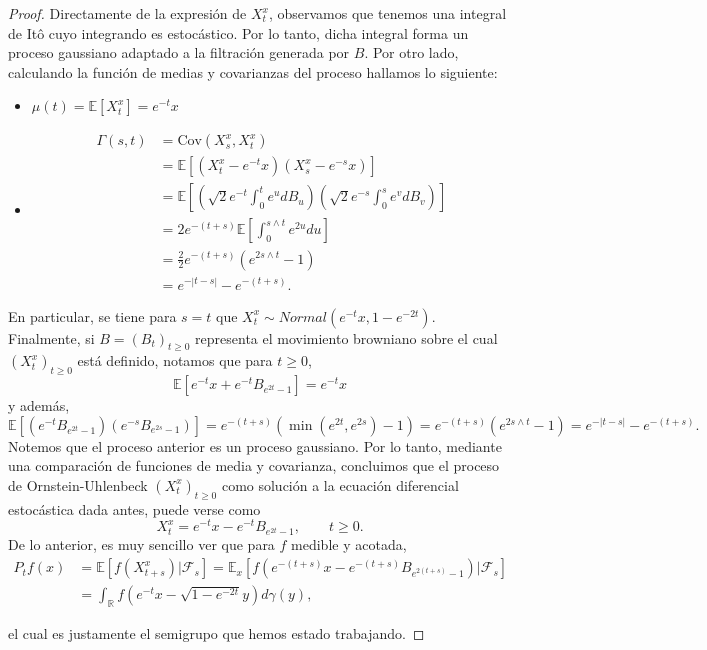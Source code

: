 \documentclass[letterpaper,twoside,12pt]{book}
\newcommand{\R}{\mathbb{R}}
\newcommand{\F}{\mathcal{F}}
\newcommand{\E}{\mathbb{E}}
\newcommand{\1}{\mathds{1}}
\theoremstyle{definition}
\theoremstyle{definition}
\theoremstyle{remark}
\theoremstyle{definition}
\theoremstyle{definition}
\theoremstyle{definition}
\theoremstyle{definition}
\theoremstyle{definition}
\begin{document}
\begin{proof}
     Directamente de la expresión de $X_t^{x}$, observamos que tenemos una integral de Itô cuyo integrando es estocástico. Por lo tanto, dicha integral forma un proceso gaussiano adaptado a la filtración generada por $B$. Por otro lado, calculando la función de medias y covarianzas del proceso hallamos lo siguiente:
     \begin{itemize}
        \item $\mu(t)=\E\left[X_t^{x}\right]=e^{-t}x$
        \item \begin{align*}\Gamma(s,t)&=\text{Cov}\left(X_s^x,X_t^x\right)\\
            &=\E\left[\left(X_t^{x}-e^{-t}x\right)\left(X_s^x-e^{-s}x\right)\right]\\
            &=\E\left[\left(\sqrt{2}e^{-t}\int_{0}^{t}e^{u}dB_u\right)\left(\sqrt{2}e^{-s}\int_{0}^{s}e^{v}dB_v\right)\right]\\
            &=2e^{-(t+s)}\E\left[\int_{0}^{s\wedge t}e^{2u}du\right]\\
            &=\frac{2}{2}e^{-(t+s)}(e^{2s\wedge t}-1)\\
            &=e^{-|t-s|}-e^{-(t+s)}.
        \end{align*}
     \end{itemize}
     En particular, se tiene para $s=t$ que $X_t^x\sim Normal(e^{-t}x,1-e^{-2t})$. Finalmente, si $B=(B_t)_{t\geq0}$ representa el movimiento browniano sobre el cual $(X_t^x)_{t\geq0}$ está definido, notamos que para $t\geq0$,
     \[
     \E\left[e^{-t}x+e^{-t}B_{e^{2t}-1}\right]=e^{-t}x
     \]
     y además, 
     \[
     \E\left[\left(e^{-t}B_{e^{2t}-1}\right) \left(e^{-s}B_{e^{2s}-1}\right)\right]=e^{-(t+s)}(\min(e^{2t},e^{2s})-1)=e^{-(t+s)}(e^{2s\wedge t}-1)=e^{-|t-s|}-e^{-(t+s)}.
     \]
     Notemos que el proceso anterior es un proceso gaussiano. Por lo tanto, mediante una comparación de funciones de media y covarianza, concluimos que el proceso de Ornstein-Uhlenbeck $(X_t^{x})_{t\geq0}$ como solución a la ecuación diferencial estocástica dada antes, puede verse como 
     \[
        X_t^{x}=e^{-t}x-e^{-t}B_{e^{2t}-1}, \qquad t\geq0.
     \]
     De lo anterior, es muy sencillo ver que para $f$ medible y acotada, 
     \begin{align*}
      P_tf(x)&=\E\left[f(X_{t+s}^{x})|\F_s\right]=\E_x\left[f(e^{-(t+s)}x-e^{-(t+s)}B_{e^{2(t+s)}-1})|\F_s\right]\\
      &=\int_\R f \left(e^{-t}x-\sqrt{1-e^{-2t}}y\right)d\gamma(y),
     \end{align*}
     
     el cual es justamente el semigrupo que hemos estado trabajando.
   \end{proof}
\end{document}
